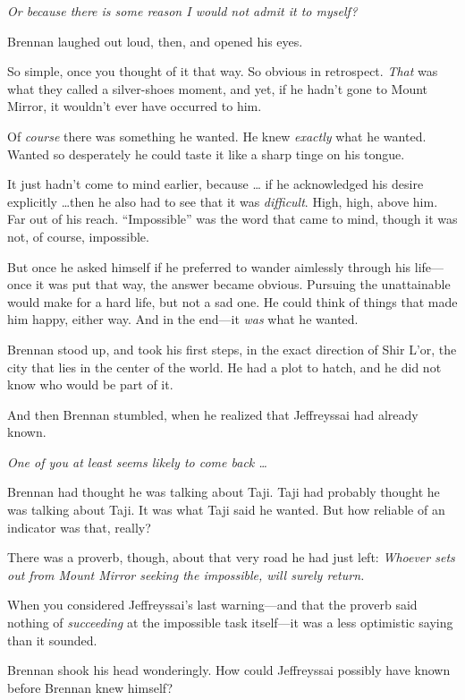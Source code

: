 {
 \textit{Or because there is some reason I would not admit it to
myself?}}

{
 Brennan laughed out loud, then, and opened his eyes.}

{
 So simple, once you thought of it that way. So obvious in
retrospect. \textit{That} was what they called a silver-shoes moment,
and yet, if he hadn't gone to Mount Mirror, it
wouldn't ever have occurred to him.}

{
 Of \textit{course} there was something he wanted. He knew
\textit{exactly} what he wanted. Wanted so desperately he could taste
it like a sharp tinge on his tongue.}

{
 It just hadn't come to mind earlier, because \ldots
if he acknowledged his desire explicitly \ldots then he also had to see
that it was \textit{difficult}. High, high, above him. Far out of his
reach. ``Impossible'' was the word
that came to mind, though it was not, of course, impossible.}

{
 But once he asked himself if he preferred to wander aimlessly
through his life---once it was put that way, the answer became obvious.
Pursuing the unattainable would make for a hard life, but not a sad
one. He could think of things that made him happy, either way. And in
the end---it \textit{was} what he wanted.}

{
 Brennan stood up, and took his first steps, in the exact direction
of Shir L'or, the city that lies in the center of the
world. He had a plot to hatch, and he did not know who would be part of
it.}

{
 And then Brennan stumbled, when he realized that Jeffreyssai had
already known.}

{
 \textit{One of you at least seems likely to come back \ldots}}

{
 Brennan had thought he was talking about Taji. Taji had probably
thought he was talking about Taji. It was what Taji said he wanted. But
how reliable of an indicator was that, really?}

{
 There was a proverb, though, about that very road he had just
left: \textit{Whoever sets out from Mount Mirror seeking the
impossible, will surely return.}}

{
 When you considered Jeffreyssai's last
warning---and that the proverb said nothing of \textit{succeeding} at
the impossible task itself---it was a less optimistic saying than it
sounded.}

{
 Brennan shook his head wonderingly. How could Jeffreyssai possibly
have known before Brennan knew himself?}

